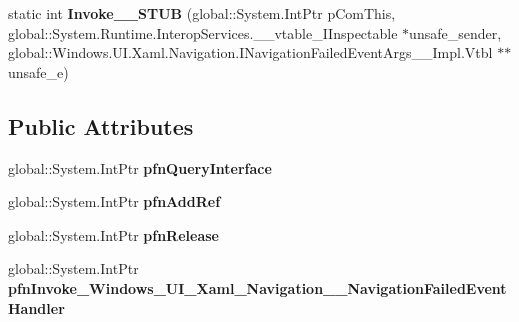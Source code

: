 \begin{DoxyCompactItemize}
\item 
\mbox{\label{struct_windows_1_1_u_i_1_1_xaml_1_1_navigation_1_1_navigation_failed_event_handler_____impl_1_1_vtbl_ad8b067dfb29168d1adf9353c44b2483f}} 
static int {\bfseries Invoke\+\_\+\+\_\+\+S\+T\+UB} (global\+::\+System.\+Int\+Ptr p\+Com\+This, global\+::\+System.\+Runtime.\+Interop\+Services.\+\_\+\+\_\+vtable\+\_\+\+I\+Inspectable $\ast$unsafe\+\_\+sender, global\+::\+Windows.\+U\+I.\+Xaml.\+Navigation.\+I\+Navigation\+Failed\+Event\+Args\+\_\+\+\_\+\+Impl.\+Vtbl $\ast$$\ast$unsafe\+\_\+e)
\end{DoxyCompactItemize}
\subsection*{Public Attributes}
\begin{DoxyCompactItemize}
\item 
\mbox{\label{struct_windows_1_1_u_i_1_1_xaml_1_1_navigation_1_1_navigation_failed_event_handler_____impl_1_1_vtbl_a9a739e7c28601c75b9e74cc55c103e53}} 
global\+::\+System.\+Int\+Ptr {\bfseries pfn\+Query\+Interface}
\item 
\mbox{\label{struct_windows_1_1_u_i_1_1_xaml_1_1_navigation_1_1_navigation_failed_event_handler_____impl_1_1_vtbl_a470f9de870e33783f97e64cb2d954776}} 
global\+::\+System.\+Int\+Ptr {\bfseries pfn\+Add\+Ref}
\item 
\mbox{\label{struct_windows_1_1_u_i_1_1_xaml_1_1_navigation_1_1_navigation_failed_event_handler_____impl_1_1_vtbl_a26770595ce8ff629f80d1f0a8297d7f0}} 
global\+::\+System.\+Int\+Ptr {\bfseries pfn\+Release}
\item 
\mbox{\label{struct_windows_1_1_u_i_1_1_xaml_1_1_navigation_1_1_navigation_failed_event_handler_____impl_1_1_vtbl_a8e56fa15ee9cdc78c3cc9ea5ffc603cc}} 
global\+::\+System.\+Int\+Ptr {\bfseries pfn\+Invoke\+\_\+\+Windows\+\_\+\+U\+I\+\_\+\+Xaml\+\_\+\+Navigation\+\_\+\+\_\+\+Navigation\+Failed\+Event\+Handler}
\end{DoxyCompactItemize}
